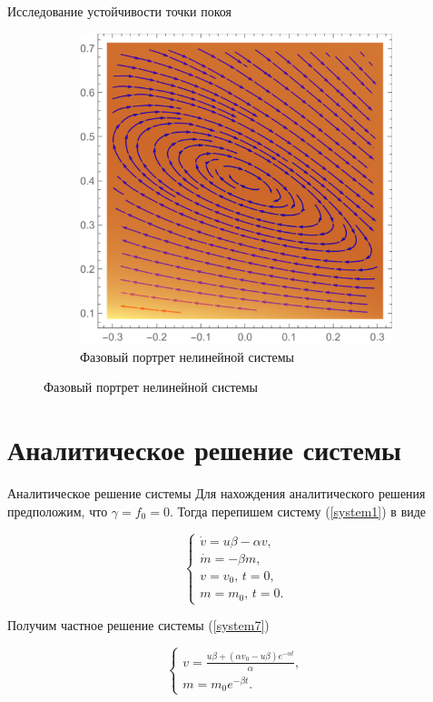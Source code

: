 \documentclass{beamer}
\begin{document}
\begin{frame}{Исследование устойчивости точки покоя}
\begin{figure}[H]
\begin{subfigure}[H]{0.4\textwidth}
			\includegraphics[width=\textwidth]{p66}
			\captionsetup{labelformat=empty}
			\caption{Фазовый портрет нелинейной системы}
		\end{subfigure}	
	\end{figure}
\end{frame}

\section{Аналитическое решение системы}
\begin{frame}{Аналитическое решение системы}
		Для нахождения аналитического решения предположим, что $\gamma=f_0=0$. Тогда перепишем систему (\ref{system1}) в виде
		\begin{block}{}
	\begin{equation}
	\begin{cases}
		\dot v=u\beta-\alpha v, \\
		\dot m=-\beta m, \\
		v=v_0,\,t=0,\\
		m=m_0,\,t=0.
	\end{cases}
	\label{system7}
\end{equation}
		\end{block}
	Получим частное решение системы (\ref{system7})
		\begin{block}{}
			\[
			\begin{cases}
			v=\frac{u\beta+(\alpha v_0-u\beta)e^{-\alpha t}}{\alpha},\\
			m=m_0e^{-\beta t}.
			\end{cases}
			\]
		\end{block}
\end{frame}
	
\end{document}
